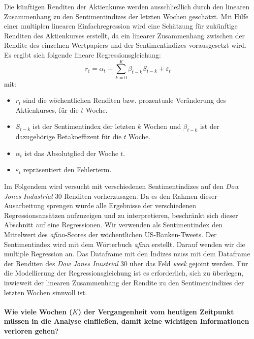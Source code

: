 Die künftigen Renditen der Aktienkurse werden ausschließlich durch den linearen Zusammenhang zu den Sentimentindizes der letzten Wochen geschätzt. Mit Hilfe einer multiplen linearen Einfachregression wird eine Schätzung für zukünftige Renditen des Aktienkurses erstellt, da ein linearer Zusammenhang zwischen der Rendite des einzelnen Wertpapiers und der Sentimentindizes vorausgesetzt wird. Es ergibt sich folgende lineare Regressionsgleichung:
\begin{equation}
r_{t}=\alpha_{t}+ \sum_{k=0}^{K} \beta_{t-k} S_{t-k}+\varepsilon_{t}
\end{equation}
mit:
\begin{itemize}
	\item  $r_{t}$ sind die wöchentlichen Renditen bzw. prozentuale Veränderung des Aktienkurses, für die $t$ Woche.
	\item $S_{t-k}$ ist der Sentimentindex der letzten $k$ Wochen und $\beta_{t-k}$ ist der dazugehörige Betakoeffizent für die $t$ Woche.
	\item $\alpha_{t}$ ist das Absolutglied der Woche $t$.
	\item $\varepsilon_{t}$ repräsentiert den Fehlerterm.
\end{itemize}
Im Folgendem wird versucht mit verschiedenen Sentimentindizes auf den \textit{Dow Jones Industrial} $30$ Renditen vorherzusagen. Da es den Rahmen dieser Ausarbeitung sprengen würde alle Ergebnisse der verschiedenen Regressionsansätzen aufzuzeigen und zu interpretieren, beschränkt sich dieser Abschnitt auf eine Regressionen. Wir verwenden als Sentimentindex den Mittelwert des \textit{afinn}-Scores der wöchentlichen US-Banken-Tweets. Der Sentimentindex wird mit dem Wörterbuch \textit{afinn} erstellt. Darauf wenden wir die multiple Regression an. Das Dataframe mit den Indizes muss mit dem Dataframe der Renditen des \textit{Dow Jones Inustrial} $30$  über das Feld \textit{week} gejoint werden. Für die Modellierung der Regressionsgleichung ist es erforderlich, sich zu überlegen, inwieweit der linearen Zusammenhang der Rendite zu den Sentimentindizes der letzten Wochen sinnvoll ist.\\
\\
\textbf{Wie viele Wochen ($K$) der Vergangenheit vom heutigen Zeitpunkt müssen in die Analyse einfließen, damit keine wichtigen Informationen verloren gehen?} 
\\
\\
